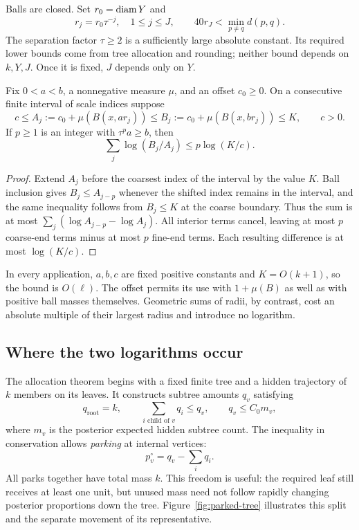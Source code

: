 Balls are closed. Set \(r_0=\operatorname{diam} Y\) and
\[
 r_j=r_0\tau^{-j},\quad 1\le j\le J,\qquad
       40r_J<\min_{p\ne q}d(p,q).
\]
The separation factor \(\tau\ge2\) is a sufficiently large absolute
constant. Its required lower bounds come from tree allocation and
rounding; neither bound depends on \(k,Y,J\). Once it is fixed,
\(J\) depends only on \(Y\).

\begin{lemma}\label{lem:scale-logarithms}
Fix \(0<a<b\), a nonnegative measure \(\mu\), and an offset \(c_0\ge0\).
On a consecutive finite interval of scale indices suppose
\[
 c\le A_j:=c_0+\mu(B(x,ar_j))
 \le B_j:=c_0+\mu(B(x,br_j))\le K,
 \qquad c>0.
\]
If \(p\ge1\) is an integer with \(\tau^p a\ge b\), then
\[
                  \sum_j\log(B_j/A_j)\le p\log(K/c).
\]
\end{lemma}

\begin{proof}
Extend \(A_j\) before the coarsest index of the interval by the value
\(K\). Ball inclusion gives \(B_j\le A_{j-p}\) whenever the shifted
index remains in the interval, and the same inequality follows from
\(B_j\le K\) at the coarse boundary. Thus the sum is at most
\(\sum_j(\log A_{j-p}-\log A_j)\). All interior terms cancel, leaving
at most \(p\) coarse-end terms minus at most \(p\) fine-end terms.
Each resulting difference is at most \(\log(K/c)\).
\end{proof}

In every application, \(a,b,c\) are fixed positive constants and
\(K=O(k+1)\), so the bound is \(O(\ell)\). The offset permits its use
with \(1+\mu(B)\) as well as with positive ball masses themselves.
Geometric sums of radii, by contrast, cost an absolute multiple of
their largest radius and introduce no logarithm.

\subsection{Where the two logarithms occur}

The allocation theorem begins with a fixed finite tree and a hidden
trajectory of \(k\) members on its leaves. It constructs subtree
amounts \(q_v\) satisfying
\[
 q_{\mathrm{root}}=k,\qquad
 \sum_{i\text{ child of }v}q_i\le q_v,\qquad
                    q_v\le C_0m_v,
\]
where \(m_v\) is the posterior expected hidden subtree count.
The inequality in conservation allows \emph{parking} at internal
vertices:
\[
                  p_v^\circ=q_v-\sum_iq_i .
\]
All parks together have total mass \(k\). This freedom is useful:
the required leaf still receives at least one unit, but unused mass
need not follow rapidly changing posterior proportions down the tree.
Figure~\ref{fig:parked-tree} illustrates this split and the separate
movement of its representative.

